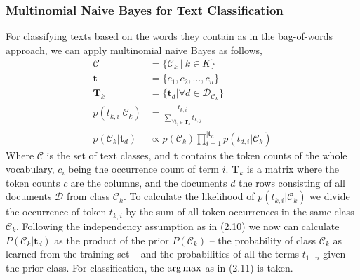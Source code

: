 \subsubsection{Multinomial Naive Bayes for Text Classification}
  For classifying texts based on the words they contain as in the bag-of-words approach, we can apply multinomial naive Bayes as follows,
  \begin{align}
    \mathcal{C} &= \{\mathcal{C}_k \: | \: k \in K \} \\
    \boldsymbol{t} &= \{c_1, c_2, \dots, c_n\} \\
    \boldsymbol{T}_{k} &= \{\boldsymbol{t}_d | \forall d \in \mathcal{D}_{\mathcal{C}_{k}}\} \\
    p({t_{k,i}}|\mathcal{C}_k) &= \frac{t_{k, i}}{\sum_{\forall t_j \in \boldsymbol{T}_k} t_{k, j}} \\
    p(\mathcal{C}_k|\boldsymbol{t}_d) &\propto p(\mathcal{C}_k) \prod_{i=1}^{|\boldsymbol{t}_d|}  p(t_{d,i}|\mathcal{C}_k)
  \end{align}
  Where $\mathcal{C}$ is the set of text classes, and $\boldsymbol{t}$ contains the token counts of the whole vocabulary, $c_i$ being the occurrence count of term $i$.
  $\boldsymbol{T}_k$ is a matrix where the token counts $c$ are the columns, and the documents $d$ the rows consisting of all documents $\mathcal{D}$ from class $\mathcal{C}_k$.
  To calculate the likelihood of $p({t_{k,i}}|\mathcal{C}_k)$ we divide the occurrence of token $t_{k,i}$ by the sum of all token occurrences in the same class $\mathcal{C}_k$.
  Following the independency assumption as in (2.10) we now can calculate $P(\mathcal{C}_k | \boldsymbol{t}_d)$ as the product of the prior $P(\mathcal{C}_k)$ -- the probability of class $\mathcal{C}_k$
  as learned from the training set -- and the probabilities of all the terms $t_{1 \dots n}$ given the prior class.
  For classification, the $\operatorname*{arg\,max}$ as in (2.11) is taken.

